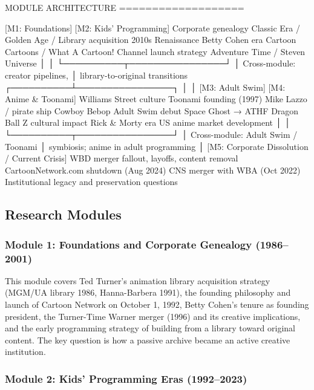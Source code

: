 \documentclass[11pt,letterpaper]{article}
\begin{document}
\begin{asciibox}
MODULE ARCHITECTURE
===================

  [M1: Foundations]          [M2: Kids' Programming]
  Corporate genealogy         Classic Era / Golden Age /
  Library acquisition         2010s Renaissance
  Betty Cohen era             Cartoon Cartoons / What A Cartoon!
  Channel launch strategy     Adventure Time / Steven Universe
         │                           │
         └──────────┬────────────────┘
                    │ Cross-module: creator pipelines,
                    │ library-to-original transitions
         ┌──────────┴────────────────┐
         │                           │
  [M3: Adult Swim]           [M4: Anime & Toonami]
  Williams Street culture     Toonami founding (1997)
  Mike Lazzo / pirate ship    Cowboy Bebop Adult Swim debut
  Space Ghost → ATHF          Dragon Ball Z cultural impact
  Rick & Morty era            US anime market development
         │                           │
         └──────────┬────────────────┘
                    │ Cross-module: Adult Swim / Toonami
                    │ symbiosis; anime in adult programming
                    │
  [M5: Corporate Dissolution / Current Crisis]
  WBD merger fallout, layoffs, content removal
  CartoonNetwork.com shutdown (Aug 2024)
  CNS merger with WBA (Oct 2022)
  Institutional legacy and preservation questions
\end{asciibox}

\subsection{Research Modules}

\subsubsection{Module 1: Foundations and Corporate Genealogy (1986--2001)}

This module covers Ted Turner's animation library acquisition strategy (MGM/UA library 1986, Hanna-Barbera 1991), the founding philosophy and launch of Cartoon Network on October 1, 1992, Betty Cohen's tenure as founding president, the Turner-Time Warner merger (1996) and its creative implications, and the early programming strategy of building from a library toward original content. The key question is how a passive archive became an active creative institution.

\subsubsection{Module 2: Kids' Programming Eras (1992--2023)}
\end{document}
